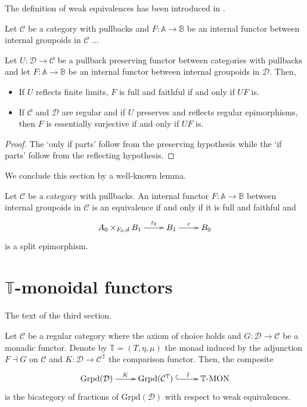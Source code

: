 \documentclass{book}
\newcommand{\A}{\mathbb{A}}
\newcommand{\B}{\mathbb{B}}
\newcommand{\C}{\mathcal{C}}
\newcommand{\D}{\mathcal{D}}
\newcommand{\T}{\mathbb{T}}
\newcommand{\cd}{\xymatrix}
\begin{document}
The definition of weak equivalences has been introduced in \cite{bunge-pare}.

\begin{definition}
Let $\C$ be a category with pullbacks and $F: \A \rightarrow \B$ be an internal functor between internal groupoids in $\C$ ...
\end{definition}



\begin{theorem} \label{preserving weak equivalences}
Let $U: \D \rightarrow \C$ be a pullback preserving functor between categories with pullbacks and let $F : \A \rightarrow \B$
be an internal functor between internal groupoids in $\D$.
Then,
\begin{itemize}
\item If $U$ reflects finite limits, $F$ is full and faithful if and only if $UF$ is.
\item If $\C$ and $\D$ are regular and if $U$ preserves and reflects regular epimorphisms, then $F$ is essentially surjective if and only if $UF$ is.
\end{itemize}
\end{theorem}

\begin{proof}
The `only if parts' follow from the preserving hypothesis while the `if parts' follow from the reflecting hypothesis.
\end{proof}

We conclude this section by a well-known lemma.

\begin{lemma}
Let $\C$ be a category with pullbacks. An internal functor $F: \A \rightarrow \B$ between internal groupoids in $\C$ is an equivalence if and only if it is full and faithful and
$$\cd{A_0 \times_{F_0,d} B_1 \ar[r]^-{t_2} & B_1 \ar[r]^-{c} & B_0}$$
is a split epimorphism.
\end{lemma}



\section{$\T$-monoidal functors} \label{section T-monoidal functors}

The text of the third section.


\begin{corollary} \label{corollary for monadic categories}
Let $\C$ be a regular category where the axiom of choice holds and $G: \D \rightarrow \C$ be a monadic functor.
Denote by $\T=(T,\eta, \mu)$ the monad induced by the adjunction $F \dashv G$ on $\C$ and $K: \D \rightarrow \C^{\T}$ the comparison functor.
Then, the composite
\begin{equation}
\cd{\text{Grpd}(\D) \ar[r]^-{K} & \text{Grpd}(\C^{\T}) \; \ar@{^{(}->}[r]^-{I} & \T \text{-MON}}
\end{equation}
is the bicategory of fractions of $\text{Grpd}(\D)$ with respect to weak equivalences.
\end{corollary}
\end{document}
